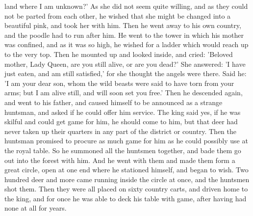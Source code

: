 \documentclass[12pt]{book}
\begin{document}
land where I am unknown?' As she did not seem quite willing, and as
they could not be parted from each other, he wished that she might be
changed into a beautiful pink, and took her with him. Then he went
away to his own country, and the poodle had to run after him. He went
to the tower in which his mother was confined, and as it was so high,
he wished for a ladder which would reach up to the very top. Then he
mounted up and looked inside, and cried: 'Beloved mother, Lady Queen,
are you still alive, or are you dead?' She answered: 'I have just
eaten, and am still satisfied,' for she thought the angels were there.
Said he: 'I am your dear son, whom the wild beasts were said to have
torn from your arms; but I am alive still, and will soon set you
free.' Then he descended again, and went to his father, and caused
himself to be announced as a strange huntsman, and asked if he could
offer him service. The king said yes, if he was skilful and could get
game for him, he should come to him, but that deer had never taken up
their quarters in any part of the district or country. Then the
huntsman promised to procure as much game for him as he could possibly
use at the royal table. So he summoned all the huntsmen together, and
bade them go out into the forest with him. And he went with them and
made them form a great circle, open at one end where he stationed
himself, and began to wish. Two hundred deer and more came running
inside the circle at once, and the huntsmen shot them. Then they were
all placed on sixty country carts, and driven home to the king, and
for once he was able to deck his table with game, after having had
none at all for years.
\end{document}
